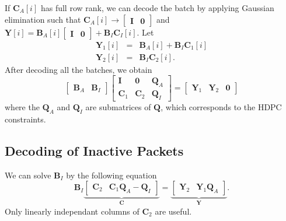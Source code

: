 \documentclass{report}
\begin{document}
If $\mathbf{C}_A[i]$ has full row rank, we can decode the batch by
applying Gaussian elimination such that $\mathbf{C}_A[i]
\rightarrow \begin{bmatrix} \mathbf{I} & \mathbf{0} \end{bmatrix}$ and
$\mathbf{Y}[i] = \mathbf{B}_A [i] \begin{bmatrix} \mathbf{I} & \mathbf{0} \end{bmatrix} + \mathbf{B}_I \mathbf{C}_I[i]$. Let
\begin{eqnarray*}
  \mathbf{Y}_1[i] & = & \mathbf{B}_A [i] + \mathbf{B}_I \mathbf{C}_1[i] \\
  \mathbf{Y}_2[i] & = & \mathbf{B}_I \mathbf{C}_2[i].
\end{eqnarray*}
After decoding all the batches, we obtain
\begin{equation*}
  \begin{bmatrix}
    \mathbf{B}_A & \mathbf{B}_I 
  \end{bmatrix}
  \begin{bmatrix}
    \mathbf{I} & \mathbf{0} & \mathbf{Q}_A\\
    \mathbf{C}_1 & \mathbf{C}_2 & \mathbf{Q}_I
  \end{bmatrix}
  = 
  \begin{bmatrix}
    \mathbf{Y}_1 & \mathbf{Y}_2 & \mathbf{0}
  \end{bmatrix}
\end{equation*}
where the $\mathbf{Q}_A$ and $\mathbf{Q}_I$ are submatrices of
$\mathbf{Q}$, which corresponds to the HDPC constraints.

\subsection{Decoding of Inactive Packets}
\label{sec:pre:inac:inac}

We can solve $\mathbf{B}_I$ by the following equation
\begin{equation*}
  \mathbf{B}_I 
  \underbrace{\begin{bmatrix}
    \mathbf{C}_2 & \mathbf{C}_1 \mathbf{Q}_A - \mathbf{Q}_I
  \end{bmatrix}}_{\mathbf{C}}
  = 
  \underbrace{\begin{bmatrix}
    \mathbf{Y}_2 & \mathbf{Y}_1\mathbf{Q}_A
  \end{bmatrix}}_{\mathbf{Y}}.
\end{equation*}
Only linearly independant columns of $\mathbf{C}_2$ are useful.
\end{document}
